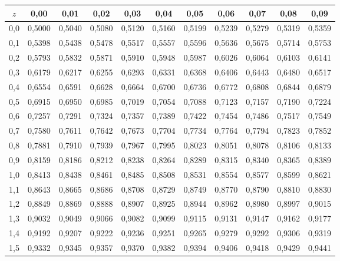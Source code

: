 \documentclass[../Notas.tex]{subfiles}
\begin{document}
\begin{table}[H]
    \centering
    \begin{tabular}{c|c|c|c|c|c|c|c|c|c|c}
        $z$ & 0,00 & 0,01 & 0,02 & 0,03 & 0,04 & 0,05 & 0,06 & 0,07 & 0,08 & 0,09 \\
        \hline 
        0,0 & 0,5000 & 0,5040 & 0,5080 & 0,5120 & 0,5160 & 0,5199 & 0,5239 & 0,5279 & 0,5319 & 0,5359 \\
        0,1 & 0,5398 & 0,5438 & 0,5478 & 0,5517 & 0,5557 & 0,5596 & 0,5636 & 0,5675 & 0,5714 & 0,5753 \\
        0,2 & 0,5793 & 0,5832 & 0,5871 & 0,5910 & 0,5948 & 0,5987 & 0,6026 & 0,6064 & 0,6103 & 0,6141 \\
        0,3 & 0,6179 & 0,6217 & 0,6255 & 0,6293 & 0,6331 & 0,6368 & 0,6406 & 0,6443 & 0,6480 & 0,6517 \\
        0,4 & 0,6554 & 0,6591 & 0,6628 & 0,6664 & 0,6700 & 0,6736 & 0,6772 & 0,6808 & 0,6844 & 0,6879 \\
        0,5 & 0,6915 & 0,6950 & 0,6985 & 0,7019 & 0,7054 & 0,7088 & 0,7123 & 0,7157 & 0,7190 & 0,7224 \\
        0,6 & 0,7257 & 0,7291 & 0,7324 & 0,7357 & 0,7389 & 0,7422 & 0,7454 & 0,7486 & 0,7517 & 0,7549 \\
        0,7 & 0,7580 & 0,7611 & 0,7642 & 0,7673 & 0,7704 & 0,7734 & 0,7764 & 0,7794 & 0,7823 & 0,7852 \\
        0,8 & 0,7881 & 0,7910 & 0,7939 & 0,7967 & 0,7995 & 0,8023 & 0,8051 & 0,8078 & 0,8106 & 0,8133 \\
        0,9 & 0,8159 & 0,8186 & 0,8212 & 0,8238 & 0,8264 & 0,8289 & 0,8315 & 0,8340 & 0,8365 & 0,8389 \\
        1,0 & 0,8413 & 0,8438 & 0,8461 & 0,8485 & 0,8508 & 0,8531 & 0,8554 & 0,8577 & 0,8599 & 0,8621 \\
        1,1 & 0,8643 & 0,8665 & 0,8686 & 0,8708 & 0,8729 & 0,8749 & 0,8770 & 0,8790 & 0,8810 & 0,8830 \\
        1,2 & 0,8849 & 0,8869 & 0,8888 & 0,8907 & 0,8925 & 0,8944 & 0,8962 & 0,8980 & 0,8997 & 0,9015 \\
        1,3 & 0,9032 & 0,9049 & 0,9066 & 0,9082 & 0,9099 & 0,9115 & 0,9131 & 0,9147 & 0,9162 & 0,9177 \\
        1,4 & 0,9192 & 0,9207 & 0,9222 & 0,9236 & 0,9251 & 0,9265 & 0,9279 & 0,9292 & 0,9306 & 0,9319 \\
        1,5 & 0,9332 & 0,9345 & 0,9357 & 0,9370 & 0,9382 & 0,9394 & 0,9406 & 0,9418 & 0,9429 & 0,9441 \\

\end{tabular}
\end{table}
\end{document}

